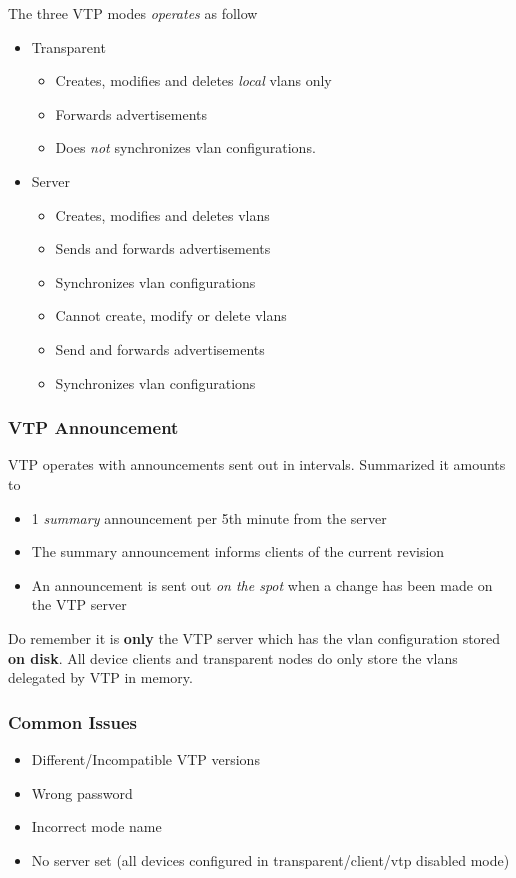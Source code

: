 \documentclass[a4paper,12pt,twoside,twocolumn]{book}
\begin{document}
The three VTP modes \textit{operates} as follow
\begin{itemize}
    \item Transparent
    \begin{itemize}
        \item Creates, modifies and deletes \textit{local} vlans only
        \item Forwards advertisements
        \item Does \textit{not} synchronizes vlan configurations.
    \end{itemize}
    \item Server
    \begin{itemize}
        \item Creates, modifies and deletes vlans
        \item Sends and forwards advertisements
        \item Synchronizes vlan configurations
    \end{itemize}
    \begin{itemize}
        \item Cannot create, modify or delete vlans
        \item Send and forwards advertisements
        \item Synchronizes vlan configurations
    \end{itemize}
\end{itemize}

\subsubsection{VTP Announcement}
VTP operates with announcements sent out in intervals. Summarized it amounts to
\begin{itemize}
    \item 1 \textit{summary} announcement per 5th minute from the server
    \item The summary announcement informs clients of the current revision
    \item An announcement is sent out \textit{on the spot} when a change has been made on the VTP server
\end{itemize}

Do remember it is \textbf{only} the VTP server which has the vlan configuration stored \textbf{on disk}. All device clients and transparent nodes do only store the vlans delegated by VTP in memory.

\subsubsection{Common Issues}
\begin{itemize}
    \item Different/Incompatible VTP versions
    \item Wrong password
    \item Incorrect mode name
    \item No server set (all devices configured in transparent/client/vtp disabled mode)
\end{itemize}
\end{document}
